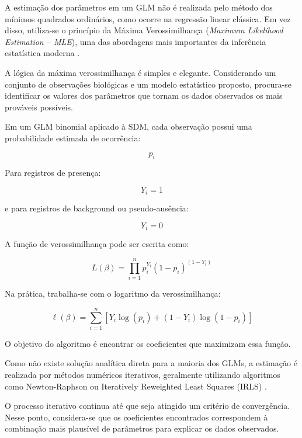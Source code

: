 A estimação dos parâmetros em um GLM não é realizada pelo método dos mínimos quadrados ordinários, como ocorre na regressão linear clássica. Em vez disso, utiliza-se o princípio da Máxima Verossimilhança (\textit{Maximum Likelihood Estimation -- MLE}), uma das abordagens mais importantes da inferência estatística moderna \citep{mccullagh1989generalized,casella2002statistical}.

A lógica da máxima verossimilhança é simples e elegante. Considerando um conjunto de observações biológicas e um modelo estatístico proposto, procura-se identificar os valores dos parâmetros que tornam os dados observados os mais prováveis possíveis.

Em um GLM binomial aplicado à SDM, cada observação possui uma probabilidade estimada de ocorrência:

\begin{equation}
	p_i
\end{equation}

Para registros de presença:

\begin{equation}
	Y_i = 1
\end{equation}

e para registros de background ou pseudo-ausência:

\begin{equation}
	Y_i = 0
\end{equation}

A função de verossimilhança pode ser escrita como:

\begin{equation}
	L(\beta)=
	\prod_{i=1}^{n}
	p_i^{Y_i}
	(1-p_i)^{(1-Y_i)}
\end{equation}

Na prática, trabalha-se com o logaritmo da verossimilhança:

\begin{equation}
	\ell(\beta)=
	\sum_{i=1}^{n}
	\left[
	Y_i\log(p_i)
	+
	(1-Y_i)\log(1-p_i)
	\right]
\end{equation}

O objetivo do algoritmo é encontrar os coeficientes que maximizam essa função.

Como não existe solução analítica direta para a maioria dos GLMs, a estimação é realizada por métodos numéricos iterativos, geralmente utilizando algoritmos como Newton-Raphson ou Iteratively Reweighted Least Squares (IRLS) \citep{mccullagh1989generalized}.

O processo iterativo continua até que seja atingido um critério de convergência. Nesse ponto, considera-se que os coeficientes encontrados correspondem à combinação mais plausível de parâmetros para explicar os dados observados.

